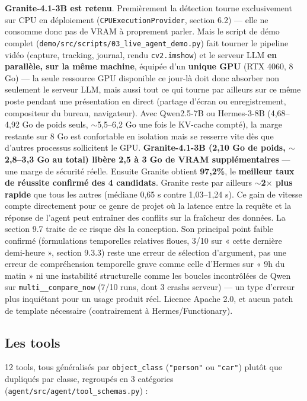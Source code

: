 \documentclass[11pt,a4paper]{article}
\let\Oldsubsection\subsection
\renewcommand{\subsection}{\FloatBarrier\Oldsubsection}
\begin{document}
    \textbf{Granite-4.1-3B est retenu}. Premièrement la détection tourne exclusivement sur CPU en déploiement
    (\texttt{CPUExecutionProvider}, section 6.2) --- elle ne consomme donc
    pas de VRAM à proprement parler. Mais le script de démo complet
    (\texttt{demo/src/scripts/03\_live\_agent\_demo.py}) fait tourner le pipeline
    vidéo (capture, tracking, journal, rendu \texttt{cv2.imshow}) et le
    serveur LLM \textbf{en parallèle, sur la même machine}, équipée d'un
    \textbf{unique GPU} (RTX 4060, 8 Go) --- la seule ressource GPU
    disponible ce jour-là doit donc absorber non seulement le serveur LLM,
    mais aussi tout ce qui tourne par ailleurs sur ce même poste pendant
    une présentation en direct (partage d'écran ou enregistrement,
    compositeur du bureau, navigateur). Avec Qwen2.5-7B ou Hermes-3-8B
    (4,68--4,92 Go de poids seuls, $\sim$5,5--6,2 Go une fois le KV-cache
    compté), la marge restante sur 8 Go est confortable en isolation mais
    se resserre vite dès que d'autres processus sollicitent le GPU.
    \textbf{Granite-4.1-3B (2,10 Go de poids, $\sim$2,8--3,3 Go au total)
    libère 2,5 à 3 Go de VRAM supplémentaires} --- une marge de sécurité
    réelle.
    Ensuite Granite obtient \textbf{97,2\%}, le \textbf{meilleur taux de
    réussite confirmé des 4 candidats}. Granite reste par ailleurs
    \textbf{$\sim$2$\times$ plus rapide} que tous les autres (médiane
    0,65 s contre 1,03--1,24 s). Ce gain de vitesse compte directement pour
    ce genre de projet où la latence entre la requête et la réponse de l'agent peut entraîner des conflits sur la fraîcheur des données. La section 9.7 traite de ce risque dès la
    conception. Son
    principal point faible confirmé (formulations temporelles relatives
    floues, 3/10 sur « cette dernière demi-heure », section 9.3.3) reste
    une erreur de sélection d'argument, pas une erreur de compréhension
    temporelle grave comme celle d'Hermes sur « 9h du matin » ni une
    instabilité structurelle comme les boucles incontrôlées de Qwen sur
    \texttt{multi\_\_compare\_now} (7/10 runs, dont 3 crashs serveur) ---
    un type d'erreur plus inquiétant pour un usage produit réel. Licence
    Apache 2.0, et aucun patch de template nécessaire (contrairement à
    Hermes/Functionary).
    
    \subsection{Les tools }
    
    12 tools, tous généralisés par
    \texttt{object\_class} (\texttt{"person"} ou \texttt{"car"}) plutôt que
    dupliqués par classe, regroupés en 3 catégories
    (\texttt{agent/src/agent/tool\_schemas.py}) :
    
\end{document}
